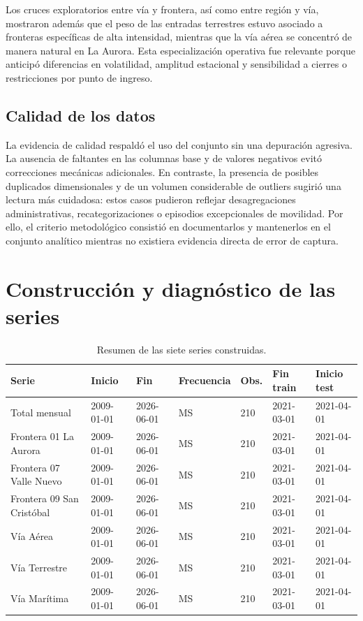 \documentclass[12pt]{article}
\begin{document}
Los cruces exploratorios entre vía y frontera, así como entre región y vía, mostraron además que el peso de las entradas terrestres estuvo asociado a fronteras específicas de alta intensidad, mientras que la vía aérea se concentró de manera natural en La Aurora. Esta especialización operativa fue relevante porque anticipó diferencias en volatilidad, amplitud estacional y sensibilidad a cierres o restricciones por punto de ingreso.

\subsection{Calidad de los datos}

La evidencia de calidad respaldó el uso del conjunto sin una depuración agresiva. La ausencia de faltantes en las columnas base y de valores negativos evitó correcciones mecánicas adicionales. En contraste, la presencia de posibles duplicados dimensionales y de un volumen considerable de outliers sugirió una lectura más cuidadosa: estos casos pudieron reflejar desagregaciones administrativas, recategorizaciones o episodios excepcionales de movilidad. Por ello, el criterio metodológico consistió en documentarlos y mantenerlos en el conjunto analítico mientras no existiera evidencia directa de error de captura.

\section{Construcción y diagnóstico de las series}

\begin{table}[H]
    \centering
    \scriptsize
    \caption{Resumen de las siete series construidas.}
    \label{tab:resumen-series}
    \begin{tabular}{lllllll}
        \toprule
        Serie & Inicio & Fin & Frecuencia & Obs. & Fin train & Inicio test \\
        \midrule
        Total mensual & 2009-01-01 & 2026-06-01 & MS & 210 & 2021-03-01 & 2021-04-01 \\
        Frontera 01 La Aurora & 2009-01-01 & 2026-06-01 & MS & 210 & 2021-03-01 & 2021-04-01 \\
        Frontera 07 Valle Nuevo & 2009-01-01 & 2026-06-01 & MS & 210 & 2021-03-01 & 2021-04-01 \\
        Frontera 09 San Cristóbal & 2009-01-01 & 2026-06-01 & MS & 210 & 2021-03-01 & 2021-04-01 \\
        Vía Aérea & 2009-01-01 & 2026-06-01 & MS & 210 & 2021-03-01 & 2021-04-01 \\
        Vía Terrestre & 2009-01-01 & 2026-06-01 & MS & 210 & 2021-03-01 & 2021-04-01 \\
        Vía Marítima & 2009-01-01 & 2026-06-01 & MS & 210 & 2021-03-01 & 2021-04-01 \\
        \bottomrule
    \end{tabular}
\end{table}
\end{document}

